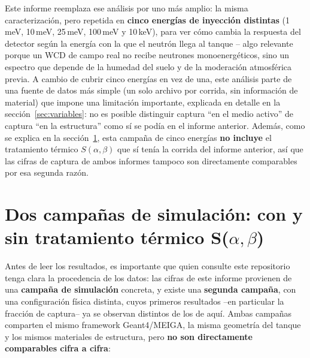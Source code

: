 \documentclass[11pt,a4paper]{article}
\begin{document}
Este informe reemplaza ese análisis por uno más amplio: la misma caracterización, pero repetida en \textbf{cinco energías de inyección distintas} (1\,meV, 10\,meV, 25\,meV, 100\,meV y 10\,keV), para ver cómo cambia la respuesta del detector según la energía con la que el neutrón llega al tanque -- algo relevante porque un WCD de campo real no recibe neutrones monoenergéticos, sino un espectro que depende de la humedad del suelo y de la moderación atmosférica previa. A cambio de cubrir cinco energías en vez de una, este análisis parte de una fuente de datos más simple (un solo archivo por corrida, sin información de material) que impone una limitación importante, explicada en detalle en
la sección~\ref{sec:variables}: no es posible distinguir captura ``en el medio activo'' de captura ``en la estructura'' como sí se podía en el informe anterior. Además, como se explica en la sección~\ref{sec:campanas}, esta campaña de cinco energías \textbf{no incluye} el tratamiento térmico $S(\alpha,\beta)$ que sí tenía la corrida del informe anterior, así que las cifras de captura de ambos informes tampoco son directamente comparables por esa segunda razón.

\section{Dos campañas de simulación: con y sin tratamiento térmico S($\alpha,\beta$)}
\label{sec:campanas}

Antes de leer los resultados, es importante que quien consulte este repositorio tenga clara la procedencia de los datos: las cifras de este informe provienen de una \textbf{campaña de simulación} concreta, y existe una \textbf{segunda campaña}, con una configuración física distinta, cuyos primeros resultados --en particular la fracción de captura-- ya se observan distintos de los de aquí. Ambas campañas comparten el mismo framework Geant4/MEIGA, la misma geometría del tanque y los mismos materiales de estructura, pero \textbf{no son directamente comparables cifra a cifra}:
\end{document}
